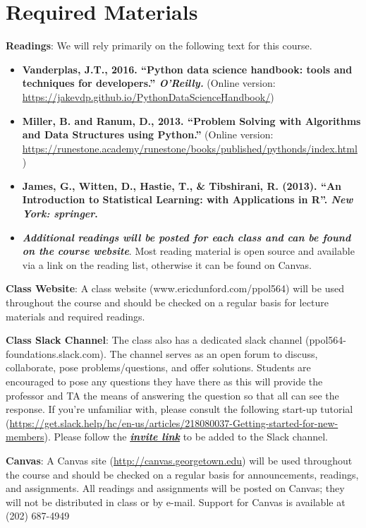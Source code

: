 \documentclass[
  12pt,
]{article}
\begin{document}
\hypertarget{required-materials}{%
\section{Required Materials}\label{required-materials}}

\textbf{Readings}: We will rely primarily on the following text for this
course.

\begin{itemize}
\item
  \textbf{Vanderplas, J.T., 2016. ``Python data science handbook: tools
  and techniques for developers.'' \emph{O'Reilly.}} (Online version:
  \url{https://jakevdp.github.io/PythonDataScienceHandbook/})
\item
  \textbf{Miller, B. and Ranum, D., 2013. ``Problem Solving with
  Algorithms and Data Structures using Python.''} (Online version:
  \url{https://runestone.academy/runestone/books/published/pythonds/index.html})
\item
  \textbf{James, G., Witten, D., Hastie, T., \& Tibshirani, R. (2013).
  ``An Introduction to Statistical Learning: with Applications in R''.
  \emph{New York: springer}.}
\item
  \textbf{\emph{Additional readings will be posted for each class and
  can be found on the course website}}. Most reading material is open
  source and available via a link on the reading list, otherwise it can
  be found on Canvas.
\end{itemize}

\textbf{Class Website}: A class website (www.ericdunford.com/ppol564)
will be used throughout the course and should be checked on a regular
basis for lecture materials and required readings.

\textbf{Class Slack Channel}: The class also has a dedicated slack
channel (ppol564-foundations.slack.com). The channel serves as an open
forum to discuss, collaborate, pose problems/questions, and offer
solutions. Students are encouraged to pose any questions they have there
as this will provide the professor and TA the means of answering the
question so that all can see the response. If you're unfamiliar with,
please consult the following start-up tutorial
(\url{https://get.slack.help/hc/en-us/articles/218080037-Getting-started-for-new-members}).
Please follow the
\href{https://join.slack.com/t/georgetown-jt44872/shared_invite/zt-gntolqrn-BiCH6ChQTKKODMyb5PdRAw}{\textbf{\emph{invite
link}}} to be added to the Slack channel.

\textbf{Canvas}: A Canvas site (\url{http://canvas.georgetown.edu}) will
be used throughout the course and should be checked on a regular basis
for announcements, readings, and assignments. All readings and
assignments will be posted on Canvas; they will not be distributed in
class or by e-mail. Support for Canvas is available at (202) 687-4949
\end{document}
